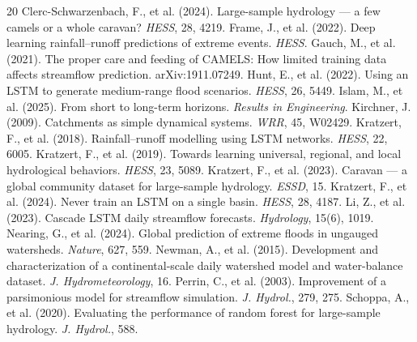 \documentclass[11pt]{article}
\begin{document}

\begin{thebibliography}{20}
 Clerc-Schwarzenbach, F.,
  et al. (2024). Large-sample hydrology --- a few camels or a whole caravan?
  \emph{HESS}, 28, 4219.
 Frame, J., et al. (2022). Deep
  learning rainfall--runoff predictions of extreme events. \emph{HESS}.
 Gauch, M., et al. (2021). The proper
  care and feeding of CAMELS: How limited training data affects streamflow
  prediction. arXiv:1911.07249.
 Hunt, E., et al. (2022). Using an LSTM
  to generate medium-range flood scenarios. \emph{HESS}, 26, 5449.
 Islam, M., et al. (2025). From short
  to long-term horizons. \emph{Results in Engineering}.
 Kirchner, J. (2009). Catchments as
  simple dynamical systems. \emph{WRR}, 45, W02429.
 Kratzert, F., et al. (2018).
  Rainfall--runoff modelling using LSTM networks. \emph{HESS}, 22, 6005.
 Kratzert, F., et al. (2019).
  Towards learning universal, regional, and local hydrological behaviors.
  \emph{HESS}, 23, 5089.
 Kratzert, F., et al. (2023).
  Caravan --- a global community dataset for large-sample hydrology.
  \emph{ESSD}, 15.
 Kratzert, F., et al. (2024).
  Never train an LSTM on a single basin. \emph{HESS}, 28, 4187.
 Li, Z., et al. (2023). Cascade LSTM daily
  streamflow forecasts. \emph{Hydrology}, 15(6), 1019.
 Nearing, G., et al. (2024).
  Global prediction of extreme floods in ungauged watersheds. \emph{Nature},
  627, 559.
 Newman, A., et al. (2015).
  Development and characterization of a continental-scale daily watershed
  model and water-balance dataset. \emph{J. Hydrometeorology}, 16.
 Perrin, C., et al. (2003).
  Improvement of a parsimonious model for streamflow simulation. \emph{J.
  Hydrol.}, 279, 275.
 Schoppa, A., et al. (2020).
  Evaluating the performance of random forest for large-sample hydrology.
  \emph{J. Hydrol.}, 588.
\end{thebibliography}
\end{document}
